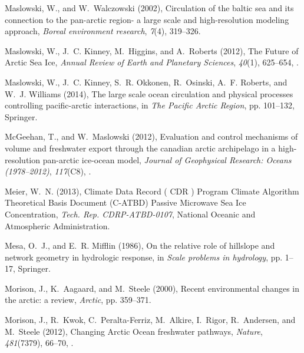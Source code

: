 \documentclass[jgrga, draft]{agutex}
\begin{document}
\begin{article}
\begin{thebibliography}{79}
Maslowski, W., and W.~Walczowski (2002), Circulation of the baltic sea and its
  connection to the pan-arctic region- a large scale and high-resolution
  modeling approach, \textit{Boreal environment research}, \textit{7}(4),
  319--326.

Maslowski, W., J.~C. Kinney, M.~Higgins, and A.~Roberts (2012), {The Future of
  Arctic Sea Ice}, \textit{Annual Review of Earth and Planetary Sciences},
  \textit{40}(1), 625--654, .

Maslowski, W., J.~C. Kinney, S.~R. Okkonen, R.~Osinski, A.~F. Roberts, and
  W.~J. Williams (2014), The large scale ocean circulation and physical
  processes controlling pacific-arctic interactions, in \textit{The Pacific
  Arctic Region}, pp. 101--132, Springer.

McGeehan, T., and W.~Maslowski (2012), Evaluation and control mechanisms of
  volume and freshwater export through the canadian arctic archipelago in a
  high-resolution pan-arctic ice-ocean model, \textit{Journal of Geophysical
  Research: Oceans (1978--2012)}, \textit{117}(C8), .

Meier, W.~N. (2013), {Climate Data Record ( CDR ) Program Climate Algorithm
  Theoretical Basis Document (C-ATBD) Passive Microwave Sea Ice Concentration},
  \textit{Tech. Rep. CDRP-ATBD-0107}, National Oceanic and Atmospheric
  Administration.

Mesa, O.~J., and E.~R. Mifflin (1986), On the relative role of hillslope and
  network geometry in hydrologic response, in \textit{Scale problems in
  hydrology}, pp. 1--17, Springer.

Morison, J., K.~Aagaard, and M.~Steele (2000), Recent environmental changes in
  the arctic: a review, \textit{Arctic}, pp. 359--371.

Morison, J., R.~Kwok, C.~Peralta-Ferriz, M.~Alkire, I.~Rigor, R.~Andersen, and
  M.~Steele (2012), {Changing Arctic Ocean freshwater pathways},
  \textit{Nature}, \textit{481}(7379), 66--70, .


\end{thebibliography}
\end{article}
\end{document}
